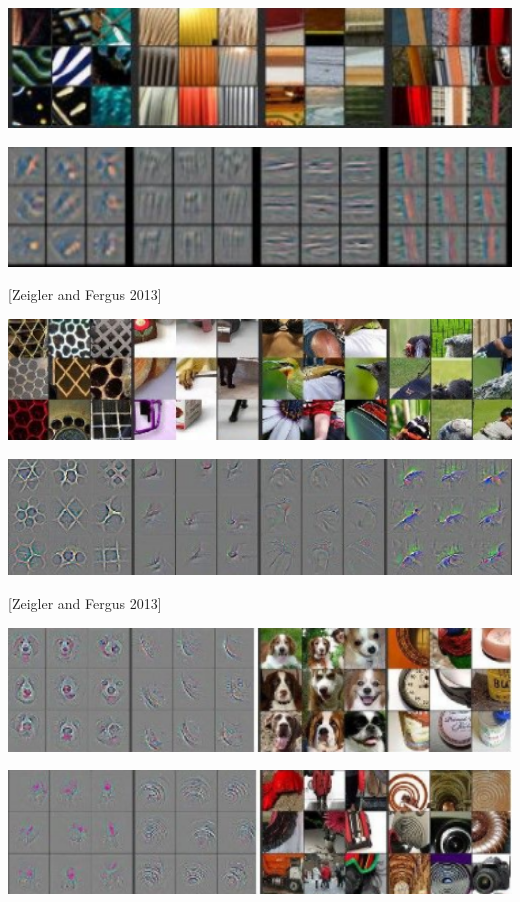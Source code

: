 {\centerline{\includegraphics[width = 8in]{../images/Deconv2IM}}

\centerline{\includegraphics[width = 8in]{../images/Deconv2}}

\centerline{[Zeigler and Fergus 2013]}


\centerline{\includegraphics[width = 8in]{../images/Deconv3IM}}

\centerline{\includegraphics[width = 8in]{../images/Deconv3}}

\centerline{[Zeigler and Fergus 2013]}


\centerline{\includegraphics[width = 8in]{../images/Deconv4a}}

\centerline{\includegraphics[width = 8in]{../images/Deconv4b}}

}

